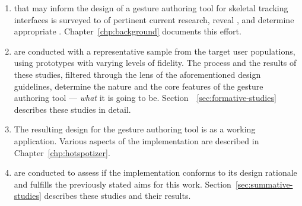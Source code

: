 \begin{enumerate}
\item {} that may inform the design of a gesture authoring tool for skeletal tracking interfaces is surveyed to  of pertinent current research, reveal , and determine appropriate . Chapter~\ref{chp:background} documents this effort.
\item {} are conducted with a representative sample from the target user populations, using prototypes with varying levels of fidelity. The process and the results of these studies, filtered through the lens of the aforementioned design guidelines, determine the nature and the core features of the gesture authoring tool --- \emph{what} it is going to be. Section~~\ref{sec:formative-studies} describes these studies in detail.
\item The resulting design for the gesture authoring tool is  as a working application. Various aspects of the implementation are described in Chapter~\ref{chp:hotspotizer}.
\item {} are conducted to assess if the implementation conforms to its design rationale and fulfills the previously stated aims for this work. Section~\ref{sec:summative-studies} describes these studies and their results.
\end{enumerate}
